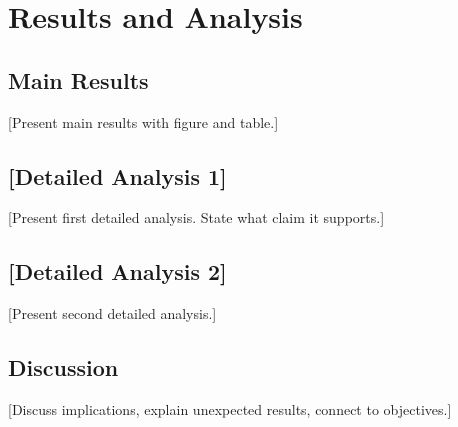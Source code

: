 
\chapter{Results and Analysis}
\label{ch:results}

\section{Main Results}
\label{sec:ch5:main}


[Present main results with figure and table.]

\section{[Detailed Analysis 1]}
\label{sec:ch5:analysis1}

[Present first detailed analysis. State what claim it supports.]

\section{[Detailed Analysis 2]}
\label{sec:ch5:analysis2}

[Present second detailed analysis.]

\section{Discussion}
\label{sec:ch5:discussion}


[Discuss implications, explain unexpected results, connect to objectives.]
